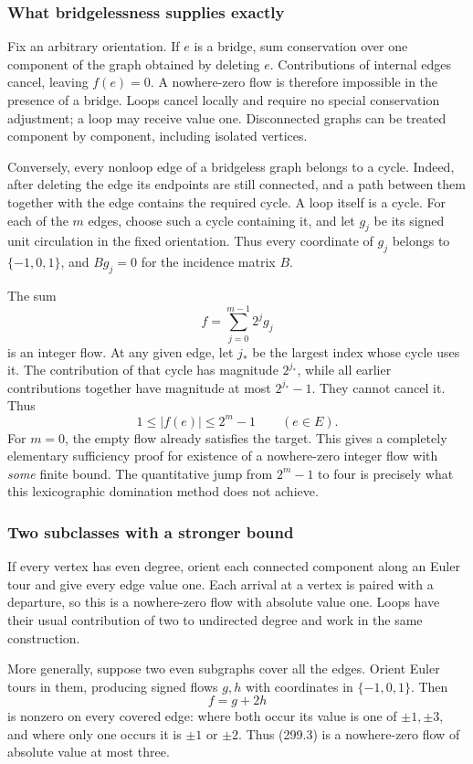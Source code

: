 \documentclass[11pt]{article}
\begin{document}
\subsubsection{What bridgelessness supplies exactly}
Fix an arbitrary orientation. If $e$ is a bridge, sum conservation over one component of the graph obtained by deleting $e$. Contributions of internal edges cancel, leaving $f(e)=0$. A nowhere-zero flow is therefore impossible in the presence of a bridge. Loops cancel locally and require no special conservation adjustment; a loop may receive value one. Disconnected graphs can be treated component by component, including isolated vertices.

Conversely, every nonloop edge of a bridgeless graph belongs to a cycle. Indeed, after deleting the edge its endpoints are still connected, and a path between them together with the edge contains the required cycle. A loop itself is a cycle. For each of the $m$ edges, choose such a cycle containing it, and let $g_j$ be its signed unit circulation in the fixed orientation. Thus every coordinate of $g_j$ belongs to $\{-1,0,1\}$, and $Bg_j=0$ for the incidence matrix $B$.

The sum
\[
 f=\sum_{j=0}^{m-1}2^j g_j
 \tag{299.1}
\]
is an integer flow. At any given edge, let $j_*$ be the largest index whose cycle uses it. The contribution of that cycle has magnitude $2^{j_*}$, while all earlier contributions together have magnitude at most $2^{j_*}-1$. They cannot cancel it. Thus
\[
 1\le |f(e)|\le 2^m-1\qquad(e\in E).
 \tag{299.2}
\]
For $m=0$, the empty flow already satisfies the target. This gives a completely elementary sufficiency proof for existence of a nowhere-zero integer flow with \emph{some} finite bound. The quantitative jump from $2^m-1$ to four is precisely what this lexicographic domination method does not achieve.

\subsubsection{Two subclasses with a stronger bound}
If every vertex has even degree, orient each connected component along an Euler tour and give every edge value one. Each arrival at a vertex is paired with a departure, so this is a nowhere-zero flow with absolute value one. Loops have their usual contribution of two to undirected degree and work in the same construction.

More generally, suppose two even subgraphs cover all the edges. Orient Euler tours in them, producing signed flows $g,h$ with coordinates in $\{-1,0,1\}$. Then
\[
 f=g+2h
 \tag{299.3}
\]
is nonzero on every covered edge: where both occur its value is one of $\pm1,\pm3$, and where only one occurs it is $\pm1$ or $\pm2$. Thus (299.3) is a nowhere-zero flow of absolute value at most three.
\end{document}
